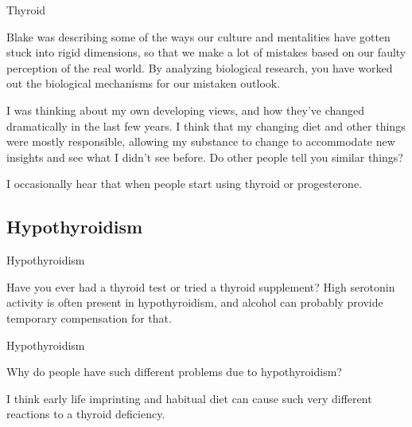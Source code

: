 \documentclass[11pt,oneside,openany,extrafontsizes]{memoir}
\begin{document}
\begin{qaexchange}{Thyroid}

    \begin{question}
        Blake was describing some of the ways our culture and mentalities have gotten stuck into rigid dimensions, so that we make a lot of mistakes based on our faulty perception of the real world. By analyzing biological research, you have worked out the biological mechanisms for our mistaken outlook.

		I was thinking about my own developing views, and how they've changed dramatically in the last few years. I think that my changing diet and other things were mostly responsible, allowing my substance to change to accommodate new insights and see what I didn't see before. Do other people tell you similar things?
    \end{question}

    \begin{answer}
      I occasionally hear that when people start using thyroid or progesterone.
    \end{answer}
\end{qaexchange}

\subsection{Hypothyroidism}

\begin{standalonequote}{Hypothyroidism}

    \begin{answer}
        Have you ever had a thyroid test or tried a thyroid supplement? High serotonin activity is often present in hypothyroidism, and alcohol can probably provide temporary compensation for that.
    \end{answer}
\end{standalonequote}

\begin{qaexchange}{Hypothyroidism}

    \begin{question}
        Why do people have such different problems due to hypothyroidism?
    \end{question}

    \begin{answer}
        I think early life imprinting and habitual diet can cause such very different reactions to a thyroid deficiency.
    \end{answer}
\end{qaexchange}
\end{document}
